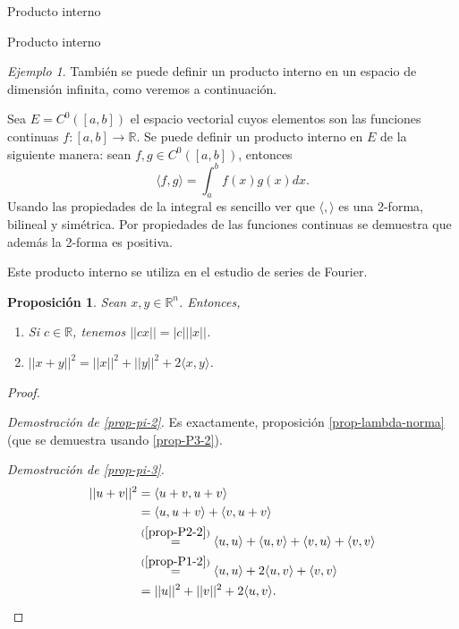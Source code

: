 \documentclass[a4paper,12pt,twoside,spanish,reqno]{amsbook}
\numberwithin{equation}{section}
\newtheorem{proposicion}[teorema]{Proposici\'on}
\theoremstyle{definition}
\theoremstyle{remark}
\newtheorem*{ejemplo*}{Ejemplo}
\newcommand{\la}{\langle}
\newcommand{\ra}{\rangle}
\newcommand{\R}{\mathbb R}
\begin{document}
\begin{chapter}{Producto interno}
\begin{section}{Producto interno}
        \begin{ejemplo*} También  se puede definir un producto interno en un espacio de dimensión infinita, como veremos a continuación.
            
            Sea $E = C^0([a,b])$ el espacio vectorial cuyos elementos son las funciones continuas $f: [a, b] \to\R$. Se puede definir un producto interno en $E$ de la siguiente manera: sean $f,g \in  C^0([a,b])$,  entonces
            \begin{equation*}
            \la f, g \ra = \int_a^b f(x)g(x) dx.
            \end{equation*}
            Usando las propiedades de la integral es sencillo ver que $\la , \ra $ es una 2-forma, bilineal y simétrica. Por propiedades de las funciones continuas se demuestra que además la 2-forma es positiva. 
            
            Este producto interno se utiliza en el estudio de series de Fourier.
        \end{ejemplo*}
            
            
        
        
        \begin{proposicion} Sean   $x,y \in \R^n$. Entonces, 
            \begin{enumerate}
                \item\label{prop-pi-2} Si $c \in \R$, tenemos $||cx|| = |c|||x||$.
                \item\label{prop-pi-3} $||x+y||^2 = ||x||^2 + ||y||^2 + 2\la x,y\ra$. 
            \end{enumerate}
        \end{proposicion}
        \begin{proof}
            
            ${}^{}$
            
            \textit{Demostración de \ref{prop-pi-2}.}  Es exactamente, proposición \ref{prop-lambda-norma} (que se demuestra usando \ref{prop-P3-2}).
            
            \textit{Demostración de \ref{prop-pi-3}.}
            \begin{align*}
                ||u+v||^2 &= \la u+v,u+v\ra\\
                &= \la u,u+v\ra+ \la v,u+v\ra  \\
                &\overset{(\ref{prop-P2-2})}{=} \la u,u\ra+ \la u,v\ra+\la v,u\ra+ \la v,v\ra  \\
                &\overset{(\ref{prop-P1-2})}{=} \la u,u\ra+ 2\la u,v\ra+ \la v,v\ra  \\
                &=||u||^2 + ||v||^2 + 2\la u,v\ra.
            \end{align*}
            

\end{proof}
\end{section}
\end{chapter}
\end{document}

